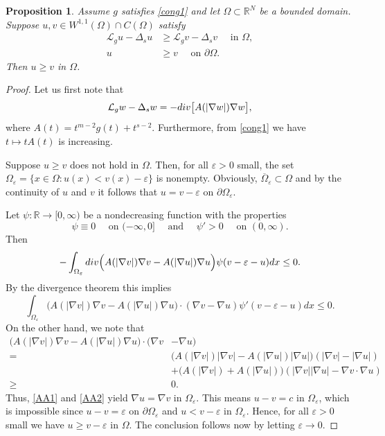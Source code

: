 \documentclass[10pt,a4paper]{amsart}
\numberwithin{equation}{section}
\newcommand{\R}{\mathbb R}
\newcommand{\Lg}{{\mathcal L}_g}
\newtheorem{proposition}[theorem]{Proposition}
\begin{document}
\begin{proposition}\label{cp}
Assume $g$ satisfies \eqref{cong1} and let $\Omega\subset \R^N$ be a bounded domain. Suppose $u,v\in W^{1,1}(\Omega)\cap C(\Omega)$ satisfy 
$$
\begin{aligned}
\Lg u-\Delta_s u &\geq \Lg v -\Delta_s v \quad\mbox{ in } \Omega, \\
u&\geq v \quad\mbox{ on } \partial\Omega.
\end{aligned}
$$ 
Then $u\geq v$ in $\Omega$.
\end{proposition}
\begin{proof} Let us first note that
$$
\Lg w-\Delta_s w=-{\rm div}\big[A(|\nabla w|)\nabla w  \big],
$$
where $A(t)=t^{m-2}g(t)+t^{s-2}$. Furthermore, from \eqref{cong1} we have $t\longmapsto tA(t)$ is increasing.

Suppose $u\geq v$ does not hold in $\Omega$. Then, for all $\varepsilon>0$ small,  the set $\Omega_\varepsilon=\{x\in \Omega:u(x)<v(x)-\varepsilon\}$ is nonempty. Obviously, $\overline \Omega_\varepsilon\subset \Omega$ and by the continuity of $u$ and $v$ it follows that $u=v-\varepsilon$ on $\partial \Omega_\varepsilon$.



Let $\psi:\R\to [0,\infty)$ be a nondecreasing function with the properties 
$$\psi \equiv 0\quad\mbox{ on }(-\infty, 0]\quad\mbox{ and }\quad \psi'>0 \quad\mbox{ on }(0,\infty).
$$ 
Then
$$
-\int_{\Omega_\varepsilon} {\rm div}\Big(A(|\nabla v|)\nabla v -A(|\nabla u|)\nabla u \Big)\psi(v-\varepsilon-u) dx\leq  0.
$$
By the divergence theorem  this implies 
\begin{equation}\label{AA1}
\int_{\Omega_\varepsilon} \Big(A(|\nabla v|)\nabla v -A(|\nabla u|)\nabla u  \Big) \cdot(\nabla v-\nabla u)\psi'(v-\varepsilon-u)dx\leq 0.
\end{equation}
On the other hand, we note that
\begin{equation}\label{AA2}
\begin{aligned}
\Big(A(|\nabla v|)\nabla v -A(|\nabla u|)\nabla u  \Big) \cdot  (\nabla v&-\nabla u)\\
=&
\Big(A(|\nabla v|)|\nabla v| -A(|\nabla u|) |\nabla u|  \Big) (|\nabla v|-|\nabla u|)\\
&+\Big(A(|\nabla v|) +A(|\nabla u|)  \Big) (|\nabla v||\nabla u|-\nabla v\cdot \nabla u)\\
\geq & 0.
\end{aligned}
\end{equation}
Thus, \eqref{AA1} and \eqref{AA2} yield $\nabla u=\nabla v$ in $\Omega_\varepsilon$. This means $u-v=c$ in $\Omega_\varepsilon$, which is impossible since $u-v=\varepsilon$ on $\partial \Omega_\varepsilon$ and $u<v-\varepsilon$ in $\Omega_\varepsilon$.
Hence, for all $\varepsilon>0$ small we have $u\geq v-\varepsilon$ in $\Omega$. The conclusion follows now by letting $\varepsilon\to 0$.
\end{proof}
\end{document}
